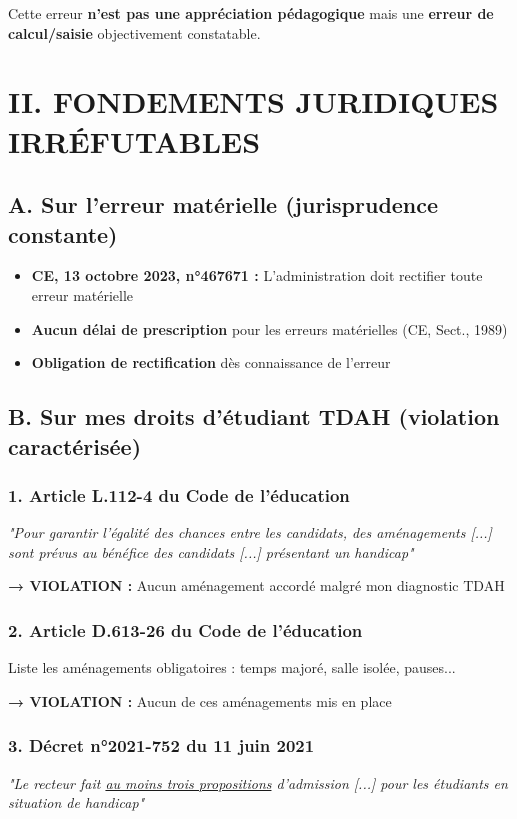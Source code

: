 \documentclass[12pt,french]{scrlttr2}
\begin{document}
\begin{letter}
Cette erreur \textbf{n'est pas une appréciation pédagogique} mais une \textbf{erreur de calcul/saisie} objectivement constatable.

\section*{II. FONDEMENTS JURIDIQUES IRRÉFUTABLES}

\subsection*{A. Sur l'erreur matérielle (jurisprudence constante)}

\begin{itemize}[leftmargin=*]
\item \textbf{CE, 13 octobre 2023, n°467671 :} L'administration doit rectifier toute erreur matérielle
\item \textbf{Aucun délai de prescription} pour les erreurs matérielles (CE, Sect., 1989)
\item \textbf{Obligation de rectification} dès connaissance de l'erreur
\end{itemize}

\subsection*{B. Sur mes droits d'étudiant TDAH (violation caractérisée)}

\subsubsection*{1. Article L.112-4 du Code de l'éducation}
\textit{"Pour garantir l'égalité des chances entre les candidats, des aménagements [...] sont prévus au bénéfice des candidats [...] présentant un handicap"}

\textbf{→ VIOLATION :} Aucun aménagement accordé malgré mon diagnostic TDAH

\subsubsection*{2. Article D.613-26 du Code de l'éducation}
Liste les aménagements obligatoires : temps majoré, salle isolée, pauses...

\textbf{→ VIOLATION :} Aucun de ces aménagements mis en place

\subsubsection*{3. Décret n°2021-752 du 11 juin 2021}
\textit{"Le recteur fait \underline{au moins trois propositions} d'admission [...] pour les étudiants en situation de handicap"}


\end{letter}
\end{document}
